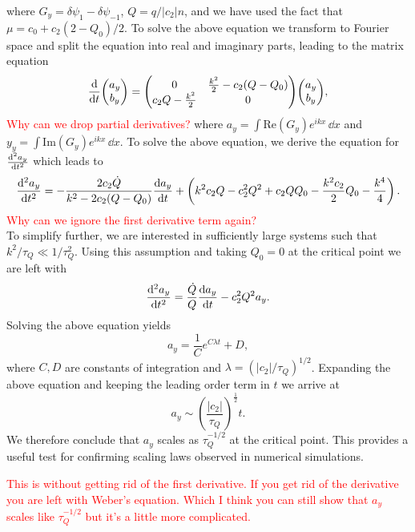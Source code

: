 where \( G_y = \delta\psi_1 - \delta\psi_{-1} \), \( Q=q/|c_2|n \), and we have
used the fact that \( \mu = c_0 + c_2(2-Q_0)/2 \).
To solve the above equation we transform to Fourier space and split the equation
into real and imaginary parts, leading to the matrix equation
\begin{equation}
    \dv{t} \mqty(a_y \\ b_y) = \mqty(0 & \frac{k^2}{2}-c_2(Q-Q_0) \\
                                     c_2Q - \frac{k^2}{2} & 0)
                                \mqty(a_y \\ b_y),
\end{equation}
\textcolor{red}{Why can we drop partial derivatives?}
where \( a_y = \int \mathrm{Re}(G_y)e^{ikx} \, \dd x \) and
\( y_y = \int \mathrm{Im}(G_y)e^{ikx} \, \dd x \).
To solve the above equation, we derive the equation for \( \dv[2]{a_y}{t} \)
which leads to
\begin{equation}
    \dv[2]{a_y}{t} = -\frac{2c_2\dot{Q}}{k^2 - 2c_2(Q-Q_0)}\dv{a_y}{t} 
    + \left(k^2c_2Q - c_2^2Q^2 + c_2QQ_0 - \frac{k^2c_2}{2}Q_0 
    - \frac{k^4}{4}\right).
\end{equation}
\textcolor{red}{Why can we ignore the first derivative term again?}\\
To simplify further, we are interested in sufficiently large systems such that
\( k^2/\tau_Q \ll 1 / \tau_Q^2 \).
Using this assumption and taking \(Q_0=0 \) at the critical point we are left
with
\begin{equation}
    \dv[2]{a_y}{t} = \frac{\dot{Q}}{Q}\dv{a_y}{t} - c_2^2Q^2a_y.
\end{equation}
Solving the above equation yields
\begin{equation}
    a_y = \frac{1}{C}e^{C\lambda t} + D,
\end{equation}
where \( C, D \) are constants of integration and
\( \lambda ={(|c_2|/\tau_Q)}^{1/2} \).
Expanding the above equation and keeping the leading order term in \( t \) we
arrive at
\begin{equation}
    a_y \sim {\left(\frac{|c_2|}{\tau_Q}\right)}^{\frac{1}{2}}t.
\end{equation}
We therefore conclude that \( a_y \) scales as \( \tau_Q^{-1/2} \) at the
critical point.
This provides a useful test for confirming scaling laws observed in numerical
simulations.

\textcolor{red}{This is without getting rid of the first derivative.
If you get rid of the derivative you are left with Weber's equation. Which
I think you can still show that \( a_y \) scales like \( \tau_Q^{-1/2} \)
but it's a little more complicated.}

